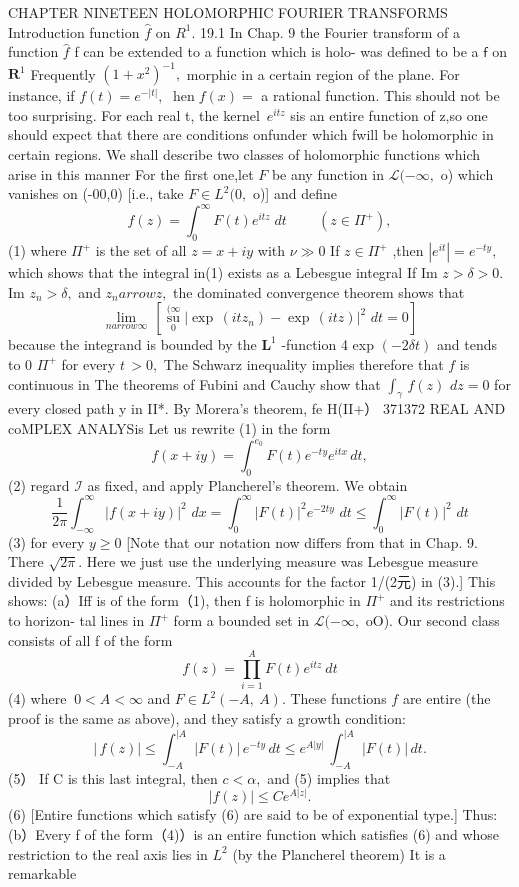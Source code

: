 CHAPTER NINETEEN HOLOMORPHIC FOURIER TRANSFORMS Introduction function $\hat{f}$ on $R^{1}.$ 19.1 In Chap. 9 the Fourier transform of a function $\hat{f}$ f can be extended to a function which is holo- was defined to be a $\boldsymbol{\mathsf{f}}$ on ${\boldsymbol{R}}^{1}$ Frequently $(1+x^{2})^{-1},$ morphic in a certain region of the plane. For instance, if $f(t)=e^{-|t|},$ $\operatorname{hen}f(x)=$ a rational function. This should not be too surprising. For each real t, the kernel $\!\,e^{i t z}$ sis an entire function of z,so one should expect that there are conditions onfunder which fwill be holomorphic in certain regions. We shall describe two classes of holomorphic functions which arise in this manner For the first one,let ${\mathbf{}}F$ be any function in ${\mathcal{L}}(-\infty,$ o) which vanishes on (-00,0) [i.e., take $F\in L^{2}(0,$ o)] and define $$ f(z)=\int_{0}^{\infty}F(t)e^{i t z}\;d t\;\;\;\;\;\;\;\;(z\in\Pi^{+}), $$ (1) where $\Pi^{+}$ is the set of all $z=x+i y$ with $\scriptstyle{\nu\gg0}$ If $z\in\Pi^{+}$ ,then $|e^{i t}|=e^{-t y},$ which shows that the integral in(1) exists as a Lebesgue integral If Im $z>\delta>0.$ Im $z_{n}>\delta,$ and $z_{n} arrow z,$ the dominated convergence theorem shows that $$ \operatorname*{lim}_{n arrow\infty}\,\left[\operatorname*{su}_{0}^{(\infty}|\exp\,(i t z_{n})-\exp\,(i t z)|^{2}\,\,d t=0\right] $$ because the integrand is bounded by the ${\boldsymbol{L}}^{1}$ -function 4 exp $(-2\delta t)$ and tends to 0 $\Pi^{+}$ for every $\scriptstyle t\,>0,$ The Schwarz inequality implies therefore that $\boldsymbol{\mathit{f}}$ is continuous in The theorems of Fubini and Cauchy show that $\textstyle\int_{\gamma}\,f(z)\,\,d z=0$ for every closed path y in II*. By Morera's theorem, fe H(II+） 371372 REAL AND coMPLEX ANALYSis Let us rewrite (1) in the form $$ f(x+i y)=\int_{0}^{e_{0}}F(t)e^{-t y}e^{i t x}\,d t, $$ (2) regard $\scriptstyle{\mathcal{I}}$ as fixed, and apply Plancherel's theorem. We obtain $$ {\frac{1}{2\pi}}\int_{-\infty}^{\infty}|f(x+i y)|^{2}\,\,d x=\int_{0}^{\infty}|F(t)|^{2}e^{-2t y}\,\,d t\leq\int_{0}^{\infty}|F(t)|^{2}\,\,d t $$ (3) for every $\scriptstyle y\geq0$ [Note that our notation now differs from that in Chap. 9. There $\sqrt{2\pi}.$ Here we just use the underlying measure was Lebesgue measure divided by Lebesgue measure. This accounts for the factor 1/(2元) in (3).] This shows: (a）Iff is of the form（1), then f is holomorphic in $\Pi^{+}$ and its restrictions to horizon- tal lines in $\Pi^{+}$ form a bounded set in ${\mathcal{L}}(-\infty,$ oO). Our second class consists of all f of the form $$ f(z)=\prod_{i=1}^{A}F(t)e^{i t z}~d t $$ (4) where $\ 0<A<\infty$ and $F\in L^{2}(-A,\ A).$ These functions $\boldsymbol{\mathit{f}}$ are entire (the proof is the same as above), and they satisfy a growth condition: $$ |\,f(z)|\leq\int_{-A}^{|A}|F(t)|\,e^{-t y}\,d t\leq e^{A|y|}\ \int_{-A}^{|A}|F(t)|\,d t. $$ (5） If C is this last integral, then $c<\alpha,$ and (5) implies that $$ |f(z)|\leq C e^{A|z|}. $$ (6) [Entire functions which satisfy (6) are said to be of exponential type.] Thus: (b）Every f of the form（4)）is an entire function which satisfies (6) and whose restriction to the real axis lies in $L^{2}$ (by the Plancherel theorem) It is a remarkable 